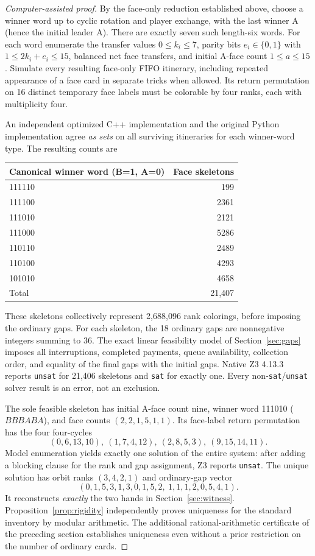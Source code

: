 \documentclass[11pt]{article}
\newcommand{\word}[1]{\texttt{#1}}
\begin{document}
\begin{proof}[Computer-assisted proof]
By the face-only reduction established above, choose a winner word up to
cyclic rotation and player exchange, with the last winner A (hence the
initial leader A). There are exactly seven such length-six words.
For each word enumerate the transfer values $0\le k_i\le7$, parity
bits $e_i\in\{0,1\}$ with $1\le 2k_i+e_i\le15$, balanced net face
transfers, and initial A-face count $1\le a\le15$.
Simulate every resulting face-only FIFO itinerary, including repeated
appearance of a face card in separate tricks when allowed. Its return
permutation on 16 distinct temporary face labels must be colorable by
four ranks, each with multiplicity four.

An independent optimized C++ implementation and the original Python
implementation agree \emph{as sets} on all surviving itineraries for each
winner-word type. The resulting counts are
\begin{center}
\begin{tabular}{@{}lr@{}}
\toprule
Canonical winner word (B=1, A=0) & Face skeletons\\
\midrule
111110 & 199\\
111100 & 2361\\
111010 & 2121\\
111000 & 5286\\
110110 & 2489\\
110100 & 4293\\
101010 & 4658\\
\midrule
Total & 21,407\\
\bottomrule
\end{tabular}
\end{center}
These skeletons collectively represent 2,688,096 rank colorings, before
imposing the ordinary gaps. For each skeleton, the 18 ordinary gaps are
nonnegative integers summing to 36. The exact linear feasibility model of
Section~\ref{sec:gaps} imposes all interruptions, completed payments, queue
availability, collection order, and equality of the final gaps with the
initial gaps. Native Z3 4.13.3 reports \word{unsat} for 21,406 skeletons and
\word{sat} for exactly one. Every non-\word{sat}/\word{unsat} solver result
is an error, not an exclusion.

The sole feasible skeleton has initial A-face count nine, winner word
111010 ($BBBABA$), and face counts $(2,2,1,5,1,1)$. Its face-label
return permutation has the four four-cycles
\[
(0,6,13,10),\ (1,7,4,12),\ (2,8,5,3),\ (9,15,14,11).
\]
Model enumeration yields exactly one solution of the entire system: after
adding a blocking clause for the rank and gap assignment, Z3 reports
\word{unsat}. The unique solution has orbit ranks $(3,4,2,1)$ and
ordinary-gap vector
\[
(0,1,5,3,1,3,0,1,5,2,\ 1,1,1,2,0,5,4,1).
\]
It reconstructs \emph{exactly} the two hands in Section~\ref{sec:witness}.
Proposition~\ref{prop:rigidity} independently proves uniqueness for the
standard inventory by modular arithmetic. The additional rational-arithmetic
certificate of the preceding section establishes uniqueness even without a
prior restriction on the number of ordinary cards.


\end{proof}
\end{document}
